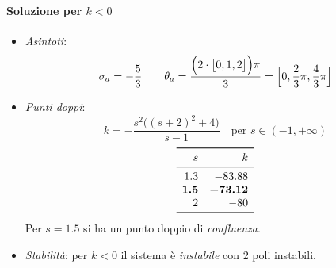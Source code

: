 \begin{esercizio}
\paragraph{Soluzione per \(k<0\)}

\begin{itemize}
	\item \emph{Asintoti}:
		\[
			\sigma_a = -\frac{5}{3} \qquad
			\theta_a = \frac{\Bigl(2\cdot\bigl[0,1,2\bigr]\Bigr)\pi}{3} = \Bigl[0,\frac{2}{3}\pi,\frac{4}{3}\pi\Bigr]
		\]
	\item \emph{Punti doppi}:
		\[
			k = -\frac{s^2\bigl((s+2)^2+4\bigr)}{s-1} \quad
			\text{per } s \in (-1,+\infty)
		\]
		\[\begin{array}{rr}
			\toprule
			s 	 & k 		\\
			\midrule
			1.3 	 & -83.88 	\\
			\bm{1.5} & \bm{-73.12} \\
			2 	 & -80 		\\
			\bottomrule
		\end{array}\]
		Per \(s=1.5\) si ha un punto doppio di \emph{confluenza}.
	\item \emph{Stabilità}: per \(k<0\) il sistema è \emph{instabile} con
		2 poli instabili.
\end{itemize}
\end{esercizio}

